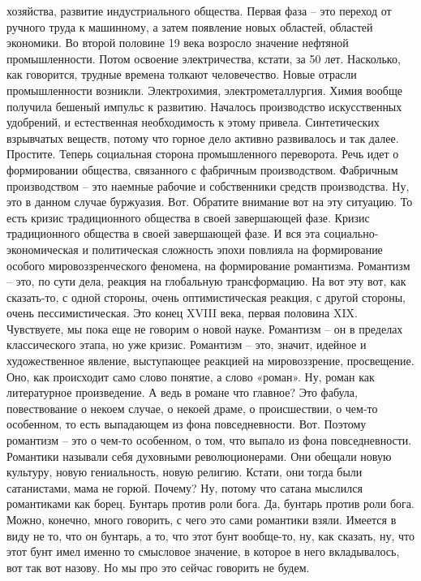 хозяйства, развитие индустриального общества. Первая фаза – это переход от
ручного труда к машинному, а затем появление новых областей, областей экономики.
Во второй половине 19 века возросло значение нефтяной промышленности. Потом
освоение электричества, кстати, за 50 лет. Насколько, как говорится, трудные
времена толкают человечество. Новые отрасли промышленности возникли.
Электрохимия, электрометаллургия. Химия вообще получила бешеный импульс к
развитию. Началось производство искусственных удобрений, и естественная
необходимость к этому привела. Синтетических взрывчатых веществ, потому что
горное дело активно развивалось и так далее. Простите. Теперь социальная сторона
промышленного переворота. Речь идет о формировании общества, связанного с
фабричным производством. Фабричным производством – это наемные рабочие и
собственники средств производства. Ну, это в данном случае буржуазия. Вот.
Обратите внимание вот на эту ситуацию. То есть кризис традиционного общества в
своей завершающей фазе. Кризис традиционного общества в своей завершающей фазе.
И вся эта социально-экономическая и политическая сложность эпохи повлияла на
формирование особого мировоззренческого феномена, на формирование романтизма.
Романтизм – это, по сути дела, реакция на глобальную трансформацию. На вот эту
вот, как сказать-то, с одной стороны, очень оптимистическая реакция, с другой
стороны, очень пессимистическая. Это конец XVIII века, первая половина XIX.
Чувствуете, мы пока еще не говорим о новой науке. Романтизм – он в пределах
классического этапа, но уже кризис. Романтизм – это, значит, идейное и
художественное явление, выступающее реакцией на мировоззрение, просвещение. Оно,
как происходит само слово понятие, а слово «роман». Ну, роман как литературное
произведение. А ведь в романе что главное? Это фабула, повествование о некоем
случае, о некоей драме, о происшествии, о чем-то особенном, то есть выпадающем
из фона повседневности. Вот. Поэтому романтизм – это о чем-то особенном, о том,
что выпало из фона повседневности. Романтики называли себя духовными
революционерами. Они обещали новую культуру, новую гениальность, новую религию.
Кстати, они тогда были сатанистами, мама не горюй. Почему? Ну, потому что сатана
мыслился романтиками как борец. Бунтарь против роли бога. Да, бунтарь против
роли бога. Можно, конечно, много говорить, с чего это сами романтики взяли.
Имеется в виду не то, что он бунтарь, а то, что этот бунт вообще-то, ну, как
сказать, ну, что этот бунт имел именно то смысловое значение, в которое в него
вкладывалось, вот так вот назову. Но мы про это сейчас говорить не будем.

